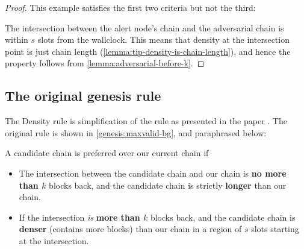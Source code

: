 \begin{proof}
This example satisfies the first two criteria but not the third:
%
\begin{center}
\end{center}
%
The intersection between the alert node's chain and the adversarial chain is
within $s$ slots from the wallclock. This means that density at the intersection
point is just chain length (\cref{lemma:tip-density-is-chain-length}), and
hence the property follows from \cref{lemma:adversarial-before-k}.
\end{proof}

\subsection{The original genesis rule}
\label{genesis:original}

The Density rule is simplification of the rule as presented in the paper
\cite{cryptoeprint:2018:378}.  The original rule is shown in
\cref{genesis:maxvalid-bg}, and paraphrased below:

\begin{definition}
\label{genesis:originalrule}
A candidate chain is preferred over our current chain if

\begin{itemize}
\item The intersection between the candidate chain and our chain is \textbf{no
more than $k$} blocks back, and the candidate chain is strictly \textbf{longer}
than our chain.

\item If the intersection \emph{is} \textbf{more than $k$} blocks back, and the
candidate chain is \textbf{denser} (contains more blocks) than our chain in
a region of $s$ slots starting at the intersection.
\end{itemize}
\end{definition}

